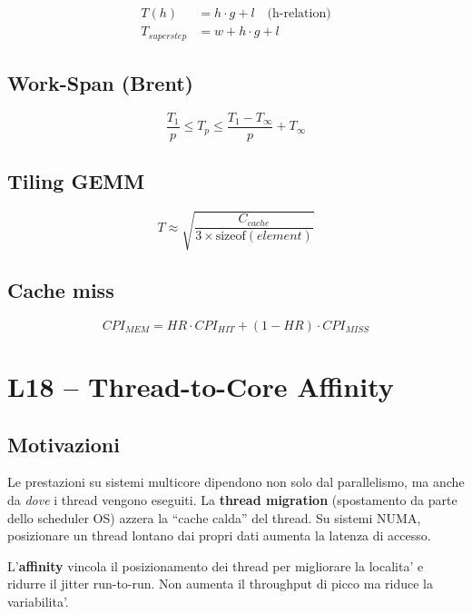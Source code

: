 \documentclass[11pt,a4paper]{article}
\theoremstyle{remark}
\begin{document}
\begin{align*}
  T(h) &= h \cdot g + l \quad \text{(h-relation)} \\
  T_{superstep} &= w + h \cdot g + l
\end{align*}

\subsection{Work-Span (Brent)}

\begin{equation*}
  \frac{T_1}{p} \leq T_p \leq \frac{T_1 - T_\infty}{p} + T_\infty
\end{equation*}

\subsection{Tiling GEMM}

\begin{equation*}
  T \approx \sqrt{\frac{C_{cache}}{3 \times \text{sizeof}(element)}}
\end{equation*}

\subsection{Cache miss}

\begin{equation*}
  CPI_{MEM} = HR \cdot CPI_{HIT} + (1-HR) \cdot CPI_{MISS}
\end{equation*}

\section{L18 -- Thread-to-Core Affinity}

\subsection{Motivazioni}

Le prestazioni su sistemi multicore dipendono non solo dal parallelismo, ma anche da \emph{dove} i thread vengono eseguiti. La \textbf{thread migration} (spostamento da parte dello scheduler OS) azzera la ``cache calda'' del thread. Su sistemi NUMA, posizionare un thread lontano dai propri dati aumenta la latenza di accesso.

L'\textbf{affinity} vincola il posizionamento dei thread per migliorare la localita' e ridurre il jitter run-to-run. Non aumenta il throughput di picco ma riduce la variabilita'.
\end{document}
